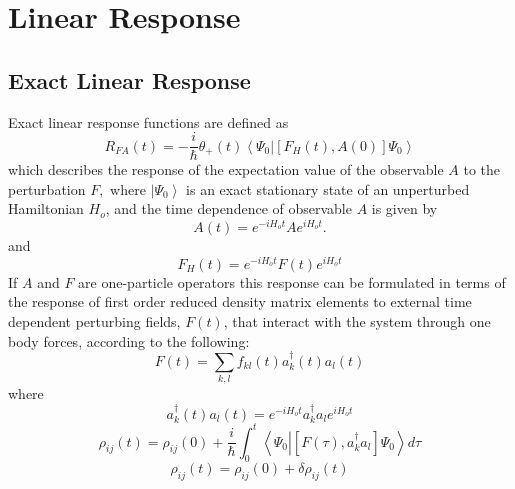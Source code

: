 \documentclass[aps,preprint]{revtex4}%
\begin{document}
\section{Linear Response\label{linres}}

\subsection{Exact Linear Response\label{exlinres}}

Exact linear response functions are defined as
\begin{equation}
R_{FA}\left(  t\right)  =-\frac{i}{\hslash}\theta_{+}\left(  t\right)
\left\langle \Psi_{0}\left\vert \left[  F_{H}\left(  t\right)  ,A\left(
0\right)  \right]  \right.  \Psi_{0}\right\rangle
\end{equation}
which describes the response of the expectation value of the observable $A$ to
the perturbation $F,$ where $\left\vert \Psi_{0}\right\rangle $ is an exact
stationary state of an unperturbed Hamiltonian $H_{o}$, and the time
dependence of observable $A$ is given by
\begin{equation}
A\left(  t\right)  =e^{-iH_{o}t}Ae^{iH_{o}t}.
\end{equation}
and
\begin{equation}
F_{H}\left(  t\right)  =e^{-iH_{o}t}F\left(  t\right)  e^{iH_{o}t}%
\end{equation}
If $A$ and $F$ are one-particle operators this response can be formulated in
terms of the response of first order reduced density matrix elements to
external time dependent perturbing fields, $F(t)$, that interact with the
system through one body forces, according to the following:%
\begin{equation}
F(t)=\sum_{k,l}f_{kl}\left(  t\right)  a_{k}^{\dagger}\left(  t\right)
a_{l}\left(  t\right)
\end{equation}
where
\begin{equation}
a_{k}^{\dagger}\left(  t\right)  a_{l}\left(  t\right)  =e^{-iH_{o}t}%
a_{k}^{\dagger}a_{l}e^{iH_{o}t}%
\end{equation}%
\begin{equation}
\rho_{ij}\left(  t\right)  =\rho_{ij}\left(  0\right)  +\frac{i}{\hslash}%
\int_{0}^{t}\left\langle \Psi_{0}\left\vert \left[  F\left(  \tau\right)
,a_{k}^{\dagger}a_{l}\right]  \right.  \Psi_{0}\right\rangle d\tau
\end{equation}%
\begin{equation}
\rho_{ij}\left(  t\right)  =\rho_{ij}\left(  0\right)  +\delta\rho_{ij}\left(
t\right)
\end{equation}%
\end{document}
